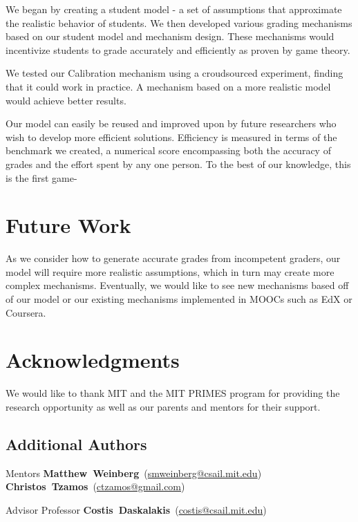 \documentclass{sigchi}
\begin{document}
We began by creating a student model - a set of assumptions that approximate the realistic behavior of students. We then developed various grading mechanisms based on our student model and mechanism design. These mechanisms would incentivize students to grade accurately and efficiently as proven by game theory.

We tested our Calibration mechanism using a croudsourced experiment, finding that it could work in practice. A mechanism based on a more realistic model would achieve better results.

Our model can easily be reused and improved upon by future researchers who wish to develop more efficient solutions. Efficiency is measured in terms of the benchmark we created, a numerical score encompassing both the accuracy of grades and the effort spent by any one person. To the best of our knowledge, this is the first game-

\section{Future Work}
As we consider how to generate accurate grades from incompetent graders, our model will require more realistic assumptions, which in turn may create more complex mechanisms.
Eventually, we would like to see new mechanisms based off of our model or our existing mechanisms implemented in MOOCs such as EdX or Coursera.


\section{Acknowledgments}
We would like to thank MIT and the MIT PRIMES program for providing the research opportunity as well as our parents and mentors for their support.

\subsection{Additional Authors}
Mentors \newline
\textbf{Matthew~Weinberg}~(\href{mailto:smweinberg@csail.mit.edu}{smweinberg@csail.mit.edu})\newline
\textbf{Christos~Tzamos}~(\href{mailto:ctzamos@gmail.com}{ctzamos@gmail.com})

Advisor \newline
Professor \textbf{Costis~Daskalakis}~(\href{mailto:costis@csail.mit.edu}{costis@csail.mit.edu})


%
%
%
%
\balance



\end{document}
